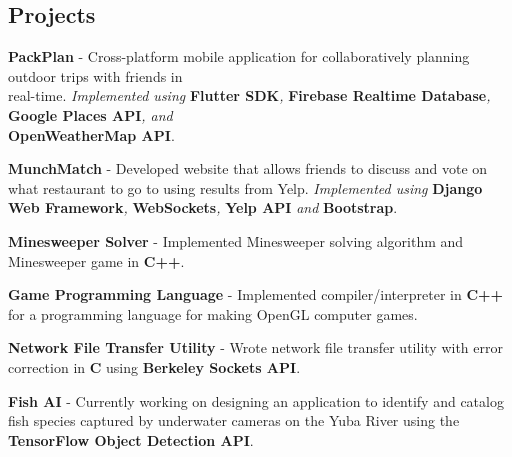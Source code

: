 \documentclass[letterpaper]{article}
\renewenvironment{itemize}{
  \begin{list}{}{
    \setlength{\leftmargin}{1.5em}
  }
}{
  \end{list}
}
\begin{document}
{\subsection*{Projects}
\begin{itemize}
    \item[$\bullet$] \textbf{PackPlan} - Cross-platform mobile application for collaboratively planning outdoor trips with friends in \\real-time. \emph{Implemented using }\textbf{Flutter SDK}\emph{, }\textbf{Firebase Realtime Database}\emph{, }\textbf{Google Places API}\emph{, and }\\\textbf{OpenWeatherMap API}.
    \item[$\bullet$] \textbf{MunchMatch} - Developed website that allows friends to discuss and vote on what restaurant to go to using results from Yelp. \emph{Implemented using }\textbf{Django Web Framework}\emph{, }\textbf{WebSockets}\emph{, }\textbf{Yelp API}\emph{ and }\textbf{Bootstrap}.
    \item[$\bullet$] \textbf{Minesweeper Solver} - Implemented Minesweeper solving algorithm and Minesweeper game in \textbf{C++}.
    \item[$\bullet$] \textbf{Game Programming Language} - Implemented compiler/interpreter in \textbf{C++} for a programming language for making OpenGL computer games.
    \item[$\bullet$] \textbf{Network File Transfer Utility} - Wrote network file transfer utility with error correction in \textbf{C} using \textbf{Berkeley Sockets API}.
    \item[$\bullet$] \textbf{Fish AI} - Currently working on designing an application to identify and catalog fish species captured by underwater cameras on the Yuba River using the \textbf{TensorFlow Object Detection API}.
\end{itemize}
\end{document}
